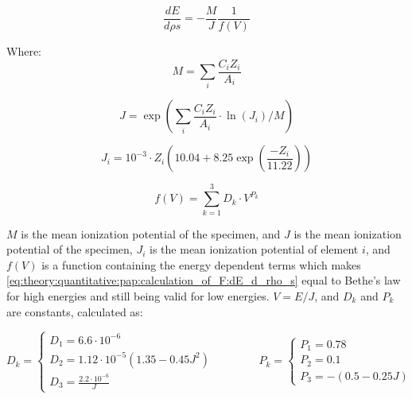 \begin{equation}
    \label{eq:theory:quantitative:pap:calculation_of_F:dE_d_rho_s}
    \frac{dE}{d\rho s} = - \frac{M}{J} \frac{1}{f(V)}
\end{equation}

Where:
\begin{equation}
    \label{eq:theory:quantitative:pap:calculation_of_F:dE_d_rho_s:M}
    M = \sum \limits_{i} \frac{C_i Z_i}{A_i}
\end{equation}

\begin{equation}
    \label{eq:theory:quantitative:pap:calculation_of_F:dE_d_rho_s:J}
    J = \exp(\sum \limits_{i} \frac{C_i Z_i}{A_i} \cdot \ln(J_i)/M)
\end{equation}

\begin{equation}
    \label{eq:theory:quantitative:pap:calculation_of_F:dE_d_rho_s:Ji}
    J_i = 10^{-3} \cdot Z_i (10.04 + 8.25 \exp(\frac{-Z_i}{11.22}))
\end{equation}

\begin{equation}
    \label{eq:theory:quantitative:pap:calculation_of_F:dE_d_rho_s:one_over_f}
    f(V) = \sum \limits_{k=1}^{3} D_k \cdot V^{P_k}
\end{equation}

$M$ is the mean ionization potential of the specimen, and $J$ is the mean ionization potential of the specimen, $J_i$ is the mean ionization potential of element $i$, and $f(V)$ is a function containing the energy dependent terms which makes \cref{eq:theory:quantitative:pap:calculation_of_F:dE_d_rho_s} equal to Bethe's law for high energies and still being valid for low energies. $V = E/J$, and $D_k$ and $P_k$ are constants, calculated as:


\begin{equation}
    \label{eq:theory:quantitative:pap:calculation_of_F:dE_d_rho_s:one_over_f:d_k}
    D_k = \begin{cases}
        D_1 = 6.6 \cdot 10^{-6}                                 \\
        D_2 = 1.12 \cdot 10^{-5}(1.35 - 0.45 J^2) \qquad \qquad \\
        D_3 = \frac{2.2 \cdot 10^{-6}}{J}
    \end{cases}
    P_k = \begin{cases}
        P_1 =  0.78 \\
        P_2 = 0.1   \\
        P_3 =  -(0.5-0.25J)
    \end{cases}
\end{equation}

